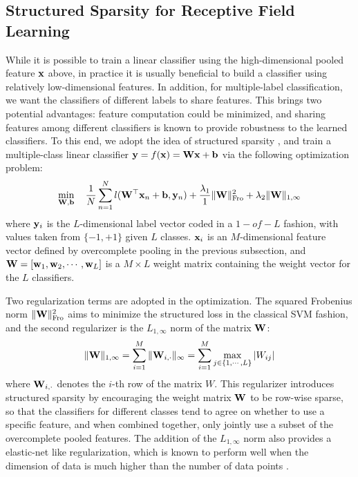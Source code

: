 \subsection{Structured Sparsity for Receptive Field Learning}
While it is possible to train a linear classifier using the high-dimensional pooled feature $\mathbf{x}$ above, in practice it is usually beneficial to build a classifier using relatively low-dimensional features. In addition, for multiple-label classification, we want the classifiers of different labels to share features. This brings two potential advantages: feature computation could be minimized, and sharing features among different classifiers is known to provide robustness to the learned classifiers. To this end, we adopt the idea of structured sparsity \cite{quattoni2008transfer,schmidt2008structure}, and train a multiple-class linear classifier $\mathbf{y} = f(\mathbf{x}) = \mathbf{W}\mathbf{x} + \mathbf{b}$ via the following optimization problem:
\begin{equation}\label{eqn:structuredsparsity}
  \min_{\mathbf{W},\mathbf{b}} \quad \frac{1}{N}\sum_{n=1}^{N}l(\mathbf{W}^\top\mathbf{x}_n+\mathbf{b}, \mathbf{y}_n) + \frac{\lambda_1}{1}\|\mathbf{W}\|_{\mathrm{Fro}}^{2} + \lambda_2\|\mathbf{W}\|_{1,\infty}
\end{equation}
where $\mathbf{y}_i$ is the $L$-dimensional label vector coded in a $1-of-L$ fashion, with values taken from $\{-1,+1\}$ given $L$ classes. $\mathbf{x}_i$ is an $M$-dimensional feature vector defined by overcomplete pooling in the previous subsection, and $\mathbf{W} = [\mathbf{w}_1,\mathbf{w}_2,\cdots, \mathbf{w}_L]$ is a $M\times L$ weight matrix containing the weight vector for the $L$ classifiers. 

Two regularization terms are adopted in the optimization. The squared Frobenius norm $\|\mathbf{W}\|_{\mathrm{Fro}}^2$ aims to minimize the structured loss in the classical SVM fashion, and the second regularizer is the $L_{1,\infty}$ norm of the matrix $\mathbf{W}$:
\begin{equation}
  \|\mathbf{W}\|_{1,\infty} = \sum_{i=1}^{M} \|\mathbf{W}_{i,\cdot}\|_{\infty} = \sum_{i=1}^{M}\max_{j\in\{1,\cdots,L\}} |W_{ij}|
\end{equation}
where $\mathbf{W}_{i,\cdot}$ denotes the $i$-th row of the matrix $W$. This regularizer introduces structured sparsity by encouraging the weight matrix $\mathbf{W}$ to be row-wise sparse, so that the classifiers for different classes tend to agree on whether to use a specific feature, and when combined together, only jointly use a subset of the overcomplete pooled features. The addition of the $L_{1,\infty}$ norm also provides a elastic-net like regularization, which is known to perform well when the dimension of data is much higher than the number of data points \cite{zou2005regularization}.

